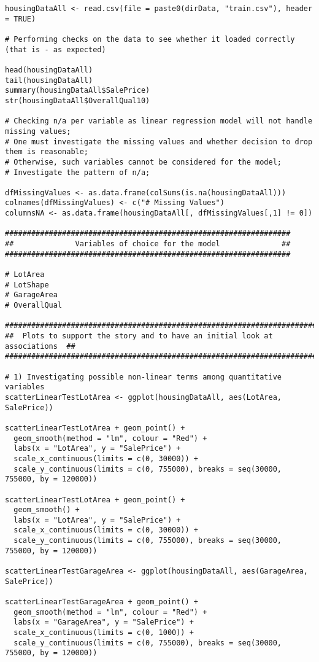\documentclass{article}
\begin{document}
\begin{tiny}
\begin{verbatim}
housingDataAll <- read.csv(file = paste0(dirData, "train.csv"), header = TRUE)

# Performing checks on the data to see whether it loaded correctly (that is - as expected)

head(housingDataAll)
tail(housingDataAll)
summary(housingDataAll$SalePrice)
str(housingDataAll$OverallQual10)

# Checking n/a per variable as linear regression model will not handle missing values;
# One must investigate the missing values and whether decision to drop them is reasonable;
# Otherwise, such variables cannot be considered for the model;
# Investigate the pattern of n/a;

dfMissingValues <- as.data.frame(colSums(is.na(housingDataAll)))
colnames(dfMissingValues) <- c("# Missing Values")
columnsNA <- as.data.frame(housingDataAll[, dfMissingValues[,1] != 0])

#################################################################
##              Variables of choice for the model              ##
#################################################################

# LotArea
# LotShape
# GarageArea
# OverallQual

##############################################################################
##  Plots to support the story and to have an initial look at associations  ##
##############################################################################

# 1) Investigating possible non-linear terms among quantitative variables
scatterLinearTestLotArea <- ggplot(housingDataAll, aes(LotArea, SalePrice))

scatterLinearTestLotArea + geom_point() + 
  geom_smooth(method = "lm", colour = "Red") + 
  labs(x = "LotArea", y = "SalePrice") +
  scale_x_continuous(limits = c(0, 30000)) +
  scale_y_continuous(limits = c(0, 755000), breaks = seq(30000, 755000, by = 120000))

scatterLinearTestLotArea + geom_point() + 
  geom_smooth() + 
  labs(x = "LotArea", y = "SalePrice") +
  scale_x_continuous(limits = c(0, 30000)) +
  scale_y_continuous(limits = c(0, 755000), breaks = seq(30000, 755000, by = 120000))

scatterLinearTestGarageArea <- ggplot(housingDataAll, aes(GarageArea, SalePrice))

scatterLinearTestGarageArea + geom_point() + 
  geom_smooth(method = "lm", colour = "Red") + 
  labs(x = "GarageArea", y = "SalePrice") +
  scale_x_continuous(limits = c(0, 1000)) +
  scale_y_continuous(limits = c(0, 755000), breaks = seq(30000, 755000, by = 120000))


\end{verbatim}
\end{tiny}
\end{document}
